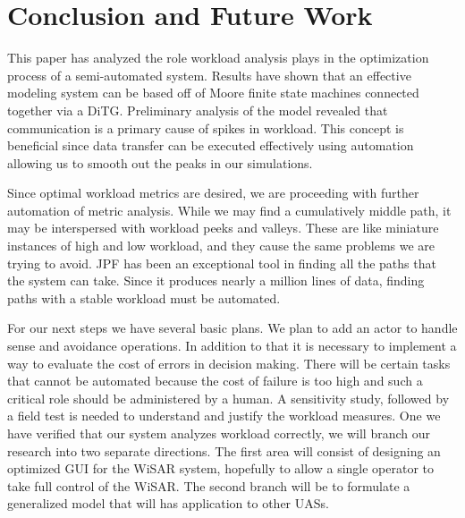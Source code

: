 \section{Conclusion and Future Work}
This paper has analyzed the role workload analysis plays in the optimization process of a semi-automated system. Results have shown that an effective modeling system can be based off of Moore finite state machines connected together via a DiTG. Preliminary analysis of the model revealed that communication is a primary cause of spikes in workload. This concept is beneficial since data transfer can be executed effectively using automation allowing us to smooth out the peaks in our simulations.

Since optimal workload metrics are desired, we are proceeding with further
automation of metric analysis. While we may find a cumulatively middle path, it may be interspersed with workload peeks and valleys. These are like miniature instances of high and low workload, and they cause the same problems we are trying to avoid. JPF has been an exceptional tool in finding all the paths that the system can take. Since it produces nearly a million lines of data, finding paths with a stable workload must be automated.

For our next steps we have several basic plans. We plan to  add an actor to handle sense and avoidance operations. In addition to that it is necessary to implement a way to evaluate the cost of errors in decision making. There will be certain tasks that cannot be automated because the cost of failure is too high and such a critical role should be administered by a human. A sensitivity study, followed by a field test is needed to understand and justify the workload measures. One we have verified that our system analyzes workload correctly, we will branch our research into two separate directions. The first area will consist of designing an optimized GUI for the WiSAR system, hopefully to allow a single operator to take full control of the WiSAR.  The second branch will be to formulate a generalized model that will has application to other UASs.
